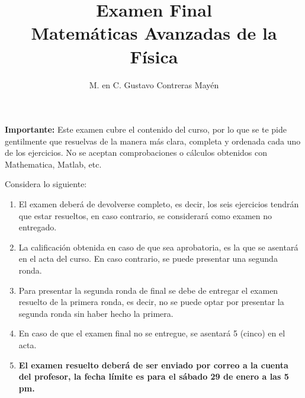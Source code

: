 
\usepackage{apacite}
\title{Examen Final \\[0.3em]  \large{Matemáticas Avanzadas de la Física}\vspace{-3ex}}
\author{M. en C. Gustavo Contreras Mayén}
\date{ }

\vspace{-4cm}
\maketitle
\fontsize{14}{14}\selectfont

\textbf{Importante: } Este examen cubre el contenido del curso, por lo que se te pide gentilmente que resuelvas de la manera más clara, completa y ordenada cada uno de los ejercicios. No se aceptan comprobaciones o cálculos obtenidos con Mathematica, Matlab, etc.
\par
Considera lo siguiente:
\begin{enumerate}
\item El examen deberá de devolverse completo, es decir, los seis ejercicios tendrán que estar resueltos, en caso contrario, se considerará como examen no entregado.
\item La calificación obtenida en caso de que sea aprobatoria, es la que se asentará en el acta del curso. En caso contrario, se puede presentar una segunda ronda.
\item Para presentar la segunda ronda de final se debe de entregar el examen resuelto de la primera ronda, es decir, no se puede optar por presentar la segunda ronda sin haber hecho la primera.
\item En caso de que el examen final no se entregue, se asentará 5 (cinco) en el acta.
\item \textbf{El examen resuelto deberá de ser enviado por correo a la cuenta del profesor, la fecha límite es para el sábado 29 de enero a las 5 pm.}
\end{enumerate}

\newpage

